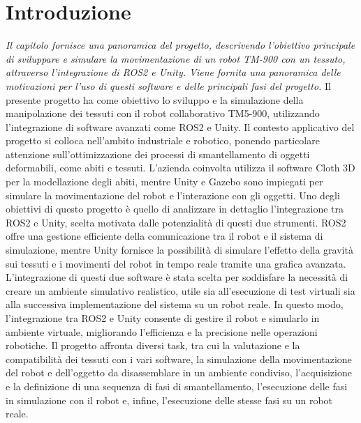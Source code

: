 \documentclass[11pt]{report}
\begin{document}
\tableofcontents
\newpage

\pagestyle{plain}

\newpage
\chapter{Introduzione}
\textit{Il capitolo fornisce una panoramica del progetto, descrivendo l'obiettivo principale di sviluppare e simulare la movimentazione di un robot TM-900 con un tessuto, attraverso l'integrazione di ROS2 e Unity. Viene fornita una panoramica delle motivazioni per l'uso di questi software e delle principali fasi del progetto.}
\vspace{0.5cm}
\newline
Il presente progetto ha come obiettivo lo sviluppo e la simulazione della manipolazione dei tessuti con il robot collaborativo TM5-900, utilizzando l'integrazione di software avanzati come ROS2 e Unity. Il contesto applicativo del progetto si colloca nell'ambito industriale e robotico, ponendo particolare attenzione sull'ottimizzazione dei processi di smantellamento di oggetti deformabili, come abiti e tessuti. L'azienda coinvolta utilizza il software Cloth 3D per la modellazione degli abiti, mentre Unity e Gazebo sono impiegati per simulare la movimentazione del robot e l'interazione con gli oggetti.
Uno degli obiettivi di questo progetto è quello di analizzare in dettaglio l'integrazione tra ROS2 e Unity, scelta motivata dalle potenzialità di questi due strumenti. ROS2 offre una gestione efficiente della comunicazione tra il robot e il sistema di simulazione, mentre Unity fornisce la possibilità di simulare l'effetto della gravità sui tessuti e i movimenti del robot in tempo reale tramite una grafica avanzata. L'integrazione di questi due software è stata scelta per soddisfare la necessità di creare un ambiente simulativo realistico, utile sia all'esecuzione di test virtuali sia alla successiva implementazione del sistema su un robot reale.
In questo modo, l'integrazione tra ROS2 e Unity consente di gestire il robot e simularlo in ambiente virtuale, migliorando l'efficienza e la precisione nelle operazioni robotiche. Il progetto affronta diversi task, tra cui la valutazione e la compatibilità dei tessuti con i vari software, la simulazione della movimentazione del robot e dell'oggetto da disassemblare in un ambiente condiviso, l'acquisizione e la definizione di una sequenza di fasi di smantellamento, l'esecuzione delle fasi in simulazione con il robot e, infine, l'esecuzione delle stesse fasi su un robot reale.
\end{document}

